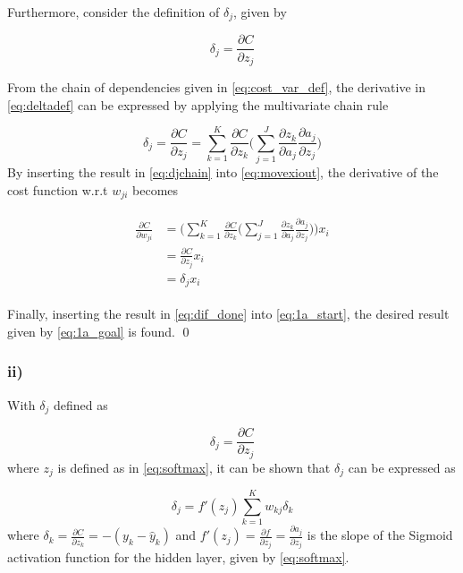 \documentclass{article}
\begin{document}
Furthermore, consider the definition of $\delta_j$, given by

\begin{equation}
    \delta_j = \frac{\partial C}{\partial z_j}
    \label{eq:deltadef}
\end{equation}
 
 From the chain of dependencies given in \eqref{eq:cost_var_def}, the derivative in \eqref{eq:deltadef} can be expressed by applying the multivariate chain rule
 
\begin{equation}
    \delta_j = \frac{\partial C}{\partial z_j} = \sum_{k=1}^K \frac{\partial C}{\partial z_k} \bigg(\sum_{j=1}^J\frac{\partial z_k}{\partial a_j}\frac{\partial a_j}{\partial z_j} \bigg)
    \label{eq:djchain}
\end{equation}
By inserting the result in \eqref{eq:djchain} into \eqref{eq:movexiout}, the derivative of the cost function w.r.t $w_{ji}$ becomes

\begin{align}
\begin{split}
     \frac{\partial C}{\partial w_{ji}} &= \Bigg(\sum_{k=1}^K \frac{\partial C}{\partial z_k}\Bigg( \sum_{j=1}^J \frac{\partial z_k}{\partial a_j}\frac{\partial a_j}{\partial z_j}\Bigg)\Bigg) x_i \\
     &= \frac{\partial C}{\partial z_j} x_i \\
     &= \delta_j x_i
\end{split}
\label{eq:dif_done}
\end{align}

Finally, inserting the result in \eqref{eq:dif_done} into \eqref{eq:1a_start}, the desired result given by \eqref{eq:1a_goal} is found. \qed

\subsubsection*{ii)}

With $\delta_j$ defined as

\begin{equation}
\delta_j = \frac{\partial C}{\partial z_j}
    \label{eq:deltaj}
\end{equation}
where $z_j$ is defined as in \eqref{eq:softmax}, it can be shown that $\delta_j$ can be expressed as

\begin{equation}
    \delta_j = f'(z_j)  \sum_{k=1}^K w_{kj} \delta_k
    \label{eq:part2goal}
\end{equation}
where $\delta_k = \frac{\partial C}{\partial z_k} = -(y_k - \hat{y}_k)$ and $f'(z_j) = \frac{\partial f}{\partial z_j} = \frac{\partial a_j}{\partial z_j}$ is the slope of the Sigmoid activation function for the hidden layer, given by \eqref{eq:softmax}.
\end{document}
